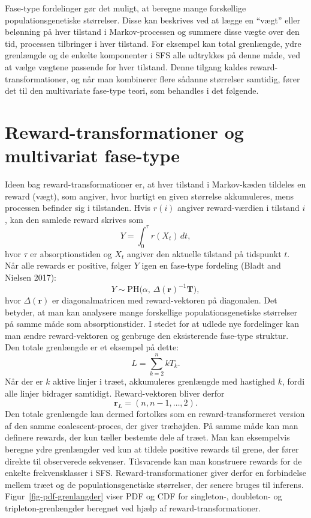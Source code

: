 \documentclass[
  10pt,
  a4paper,
]{scrbook}
\begin{document}
Fase-type fordelinger gør det muligt, at beregne mange forskellige
populationsgenetiske størrelser. Disse kan beskrives ved at lægge en
``vægt'' eller belønning på hver tilstand i Markov-processen og summere
disse vægte over den tid, processen tilbringer i hver tilstand. For
eksempel kan total grenlængde, ydre grenlængde og de enkelte komponenter
i SFS alle udtrykkes på denne måde, ved at vælge vægtene passende for
hver tilstand. Denne tilgang kaldes reward-transformationer, og når man
kombinerer flere sådanne størrelser samtidig, fører det til den
multivariate fase-type teori, som behandles i det følgende.

\section{Reward-transformationer og multivariat
fase-type}\label{reward-transformationer-og-multivariat-fase-type}

Ideen bag reward-transformationer er, at hver tilstand i Markov-kæden
tildeles en reward (vægt), som angiver, hvor hurtigt en given størrelse
akkumuleres, mens processen befinder sig i tilstanden. Hvis \(r(i)\)
angiver reward-værdien i tilstand \(i\), kan den samlede reward skrives
som \[
Y = \int_0^\tau r(X_t)\,dt,
\] hvor \(\tau\) er absorptionstiden og \(X_t\) angiver den aktuelle
tilstand på tidspunkt \(t\).\\
Når alle rewards er positive, følger \(Y\) igen en fase-type fordeling
(Bladt and Nielsen 2017): \[
Y \sim \mathrm{PH}\!\bigl(\alpha,\, \Delta(\mathbf{r})^{-1}\mathbf{T}\bigr),
\] hvor \(\Delta(\mathbf{r})\) er diagonalmatricen med reward-vektoren
på diagonalen. Det betyder, at man kan analysere mange forskellige
populationsgenetiske størrelser på samme måde som absorptionstider. I
stedet for at udlede nye fordelinger kan man ændre reward-vektoren og
genbruge den eksisterende fase-type struktur.\\
Den totale grenlængde er et eksempel på dette: \[
L = \sum_{k=2}^n kT_k.
\] Når der er \(k\) aktive linjer i træet, akkumuleres grenlængde med
hastighed \(k\), fordi alle linjer bidrager samtidigt. Reward-vektoren
bliver derfor \[
\mathbf{r}_L=(n,n-1,\ldots,2).
\] Den totale grenlængde kan dermed fortolkes som en
reward-transformeret version af den samme coalescent-proces, der giver
træhøjden. På samme måde kan man definere rewards, der kun tæller
bestemte dele af træet. Man kan eksempelvis beregne ydre grenlængder ved
kun at tildele positive rewards til grene, der fører direkte til
observerede sekvenser. Tilsvarende kan man konstruere rewards for de
enkelte frekvensklasser i SFS. Reward-transformationer giver derfor en
forbindelse mellem træet og de populationsgenetiske størrelser, der
senere bruges til inferens.\\
Figur~\ref{fig-pdf-grenlangder} viser PDF og CDF for singleton-,
doubleton- og tripleton-grenlængder beregnet ved hjælp af
reward-transformationer.
\end{document}
